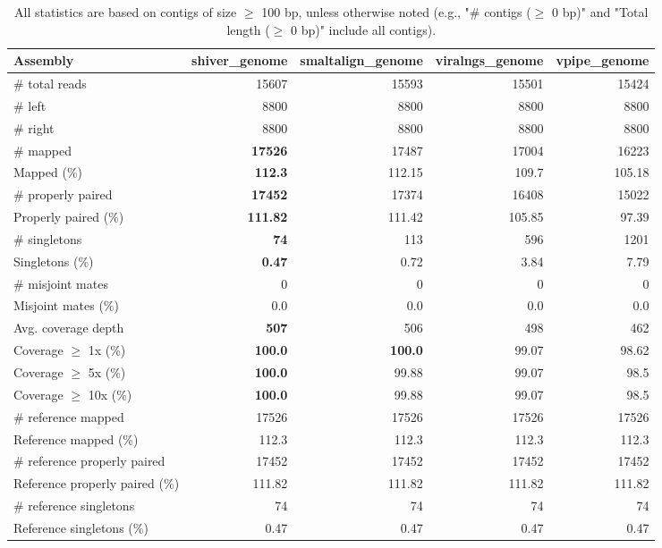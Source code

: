\documentclass[12pt,a4paper]{article}
\begin{document}
\begin{table}[ht]
\begin{center}
\caption{All statistics are based on contigs of size $\geq$ 100 bp, unless otherwise noted (e.g., "\# contigs ($\geq$ 0 bp)" and "Total length ($\geq$ 0 bp)" include all contigs).}
\begin{tabular}{|l*{4}{|r}|}
\hline
Assembly & shiver\_genome & smaltalign\_genome & viralngs\_genome & vpipe\_genome \\ \hline
\# total reads & 15607 & 15593 & 15501 & 15424 \\ \hline
\# left & 8800 & 8800 & 8800 & 8800 \\ \hline
\# right & 8800 & 8800 & 8800 & 8800 \\ \hline
\# mapped & {\bf 17526} & 17487 & 17004 & 16223 \\ \hline
Mapped (\%) & {\bf 112.3} & 112.15 & 109.7 & 105.18 \\ \hline
\# properly paired & {\bf 17452} & 17374 & 16408 & 15022 \\ \hline
Properly paired (\%) & {\bf 111.82} & 111.42 & 105.85 & 97.39 \\ \hline
\# singletons & {\bf 74} & 113 & 596 & 1201 \\ \hline
Singletons (\%) & {\bf 0.47} & 0.72 & 3.84 & 7.79 \\ \hline
\# misjoint mates & 0 & 0 & 0 & 0 \\ \hline
Misjoint mates (\%) & 0.0 & 0.0 & 0.0 & 0.0 \\ \hline
Avg. coverage depth & {\bf 507} & 506 & 498 & 462 \\ \hline
Coverage $\geq$ 1x (\%) & {\bf 100.0} & {\bf 100.0} & 99.07 & 98.62 \\ \hline
Coverage $\geq$ 5x (\%) & {\bf 100.0} & 99.88 & 99.07 & 98.5 \\ \hline
Coverage $\geq$ 10x (\%) & {\bf 100.0} & 99.88 & 99.07 & 98.5 \\ \hline
\# reference mapped & 17526 & 17526 & 17526 & 17526 \\ \hline
Reference mapped (\%) & 112.3 & 112.3 & 112.3 & 112.3 \\ \hline
\# reference properly paired & 17452 & 17452 & 17452 & 17452 \\ \hline
Reference properly paired (\%) & 111.82 & 111.82 & 111.82 & 111.82 \\ \hline
\# reference singletons & 74 & 74 & 74 & 74 \\ \hline
Reference singletons (\%) & 0.47 & 0.47 & 0.47 & 0.47 \\ \hline

\end{tabular}
\end{center}
\end{table}
\end{document}

